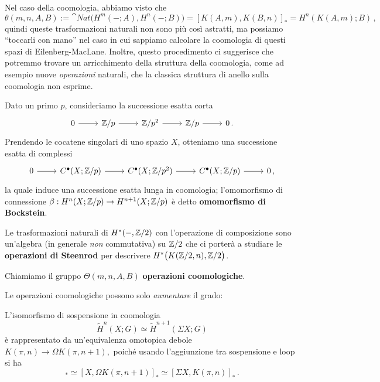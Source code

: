Nel caso della coomologia, abbiamo visto che
\begin{equation*}
	\theta(m,n,A,B) := \cat{Nat}\Big(H^{m}(-;A), H^{n}(-;B) \Big)
	= [K(A,m),K(B,n)]_{\ast} = H^{n}(K(A,m);B)\,,
\end{equation*}
quindi queste trasformazioni naturali non sono più
così astratti, ma possiamo ``toccarli con mano'' nel caso in
cui sappiamo calcolare la coomologia di questi spazi di Eilenberg-MacLane.
Inoltre, questo procedimento ci suggerisce che
potremmo trovare un arricchimento della struttura
della coomologia, come ad esempio nuove \emph{operazioni}
naturali, che la classica struttura di anello sulla coomologia
non esprime.

\begin{ex}
	Dato un primo $p$, consideriamo la successione esatta corta
	\begin{equation*}
		\begin{tikzcd}
			0 \ar[r]
			& \Z/p \ar[r]
			& \Z/p^{2} \ar[r]
			& \Z/p \ar[r]
			& 0\,.
		\end{tikzcd}
	\end{equation*}
	Prendendo le cocatene singolari di uno spazio $X$,
	otteniamo una successione esatta di complessi
	\begin{equation*}
		\begin{tikzcd}
			0 \ar[r]
			& C^{\bullet}(X;\Z/p) \ar[r]
			& C^{\bullet}(X;\Z/p^{2}) \ar[r]
			& C^{\bullet}(X;\Z/p) \ar[r]
			& 0\,,
		\end{tikzcd}
	\end{equation*}
	la quale induce una successione esatta lunga in coomologia;
	l'omomorfismo di connessione $\beta:H^{n}(X;{\mathbb Z}/p) \to H^{n+1}(X;{\mathbb Z}/p)$
	è detto \textbf{omomorfismo di Bockstein}.
\end{ex}

Le trasformazioni naturali di $H^{*}(-,{\mathbb Z}/2)$
con l'operazione di composizione sono un'algebra 
(in generale \emph{non} commutativa) su ${\mathbb Z}/2$
che ci porterà a studiare le \textbf{operazioni di Steenrod}
per descrivere $H^{*}\big( K({\mathbb Z}/2,n),{\mathbb Z}/2 \big)$.

\begin{df}
	Chiamiamo il gruppo $\Theta(m,n,A,B)$ \textbf{operazioni coomologiche}.
\end{df}

\begin{oss}
	Le operazioni coomologiche possono solo \emph{aumentare} il grado:
\end{oss}

\begin{oss}
	L'isomorfismo di sospensione in coomologia
	\begin{equation*}
		\widetilde{H}^{n}(X;G) \simeq \widetilde{H}^{n+1}(\Sigma X;G)
	\end{equation*}
	è rappresentato da un'equivalenza omotopica debole
		$K(\pi,n) \to \Omega K(\pi,n+1),$
	poiché usando l'aggiunzione tra sospensione e loop si ha
	\begin{equation*}
		 [X,K(\pi,n)]_{\ast} \simeq  [X,\Omega K(\pi,n+1)]_{\ast} \simeq  [\Sigma X,K(\pi,n)]_{\ast}\,.
	\end{equation*}
\end{oss}

